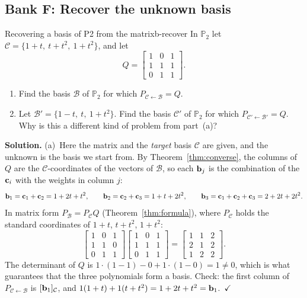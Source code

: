 \documentclass[11pt]{article}
\begin{document}
\subsection*{Bank F: Recover the unknown basis}
\begin{exmp}{Recovering a basis of P2 from the matrix}{b-recover}
In $\mathbb{P}_2$ let $\mathcal{C}=\{1+t,\ t+t^2,\ 1+t^2\}$, and let
\[
Q=\begin{bmatrix}1&0&1\\1&1&1\\0&1&1\end{bmatrix}.
\]
\begin{enumerate}
  \item[(a)] Find the basis $\mathcal{B}$ of $\mathbb{P}_2$ for which $P_{\mathcal{C}\leftarrow\mathcal{B}}=Q$.
  \item[(b)] Let $\mathcal{B}'=\{1-t,\ t,\ 1+t^2\}$. Find the basis $\mathcal{C}'$ of $\mathbb{P}_2$ for which $P_{\mathcal{C}'\leftarrow\mathcal{B}'}=Q$. Why is this a different kind of problem from part~(a)?
\end{enumerate}

\textbf{Solution.}
(a)~Here the matrix and the \emph{target} basis $\mathcal{C}$ are given, and the unknown is the basis we start from. By Theorem~\ref{thm:converse}, the columns of $Q$ are the $\mathcal{C}$-coordinates of the vectors of $\mathcal{B}$, so each $\mathbf{b}_j$ is the combination of the $\mathbf{c}_i$ with the weights in column $j$:
\[
\mathbf{b}_1=\mathbf{c}_1+\mathbf{c}_2=1+2t+t^2,\qquad \mathbf{b}_2=\mathbf{c}_2+\mathbf{c}_3=1+t+2t^2,\qquad \mathbf{b}_3=\mathbf{c}_1+\mathbf{c}_2+\mathbf{c}_3=2+2t+2t^2.
\]
In matrix form $P_{\mathcal{B}}=P_{\mathcal{C}}Q$ (Theorem~\ref{thm:formula}), where $P_{\mathcal{C}}$ holds the standard coordinates of $1+t$, $t+t^2$, $1+t^2$:
\[
\begin{bmatrix}1&0&1\\1&1&0\\0&1&1\end{bmatrix}\begin{bmatrix}1&0&1\\1&1&1\\0&1&1\end{bmatrix}=\begin{bmatrix}1&1&2\\2&1&2\\1&2&2\end{bmatrix}.
\]
The determinant of $Q$ is $1\cdot(1-1)-0+1\cdot(1-0)=1\neq0$, which is what guarantees that the three polynomials form a basis. Check: the first column of $P_{\mathcal{C}\leftarrow\mathcal{B}}$ is $[\mathbf{b}_1]_{\mathcal{C}}$, and $1(1+t)+1(t+t^2)=1+2t+t^2=\mathbf{b}_1$.\ $\checkmark$


\end{exmp}
\end{document}
